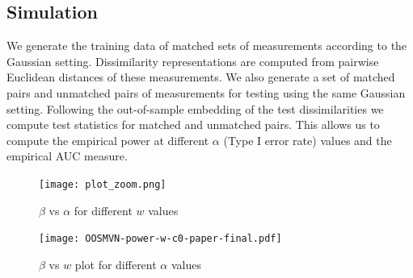 \documentclass[12pt]{article} %
\begin{document}
\subsection{Simulation\label{subsec:sim}}

We generate the training data of matched sets of measurements according to  the Gaussian setting. Dissimilarity representations are computed from pairwise Euclidean distances of these measurements. We also generate a set of matched pairs and unmatched pairs of measurements for testing using the same Gaussian setting. Following the out-of-sample embedding of the test dissimilarities 
we compute test statistics  for matched and unmatched pairs. This allows us to compute the empirical power  at different $\alpha$ (Type I error rate) values and the empirical AUC measure.



\begin{figure}[tb]
     \centering
\texttt{[image: plot\_zoom.png]}
\caption{$\beta$ vs $\alpha$  for different $w$ values }
\label{fig:MVN-c0-power-alpha}
\end{figure}

\begin{figure}[tb]
      \centering
         \texttt{[image: OOSMVN-power-w-c0-paper-final.pdf]}
\caption{$\beta$ vs $w$ plot for different $\alpha$ values }
\label{fig:MVN-c0-power-w}
      

  \end{figure}
	
\end{document}
